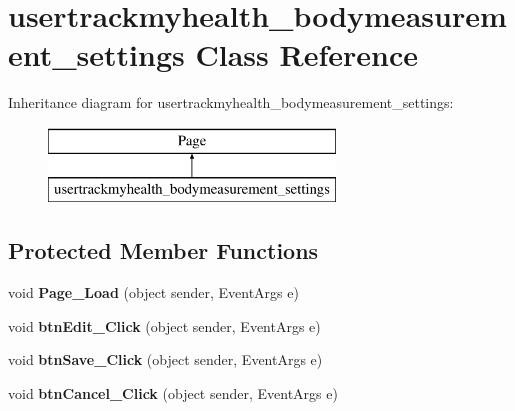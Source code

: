 \hypertarget{classusertrackmyhealth__bodymeasurement__settings}{\section{usertrackmyhealth\-\_\-bodymeasurement\-\_\-settings Class Reference}
\label{classusertrackmyhealth__bodymeasurement__settings}
}
Inheritance diagram for usertrackmyhealth\-\_\-bodymeasurement\-\_\-settings\-:\begin{figure}[H]
\begin{center}
\leavevmode
\includegraphics[height=2.000000cm]{classusertrackmyhealth__bodymeasurement__settings}
\end{center}
\end{figure}
\subsection*{Protected Member Functions}
\begin{DoxyCompactItemize}
\item 
\hypertarget{classusertrackmyhealth__bodymeasurement__settings_aaa54c5156b49fa58d9e7e03e2140f17f}{void {\bfseries Page\-\_\-\-Load} (object sender, Event\-Args e)}\label{classusertrackmyhealth__bodymeasurement__settings_aaa54c5156b49fa58d9e7e03e2140f17f}

\item 
\hypertarget{classusertrackmyhealth__bodymeasurement__settings_a49cf78ba0ea6ad63fdacab7d489a00f2}{void {\bfseries btn\-Edit\-\_\-\-Click} (object sender, Event\-Args e)}\label{classusertrackmyhealth__bodymeasurement__settings_a49cf78ba0ea6ad63fdacab7d489a00f2}

\item 
\hypertarget{classusertrackmyhealth__bodymeasurement__settings_a32c862dcfe157fd3b7885c4a8134f7dc}{void {\bfseries btn\-Save\-\_\-\-Click} (object sender, Event\-Args e)}\label{classusertrackmyhealth__bodymeasurement__settings_a32c862dcfe157fd3b7885c4a8134f7dc}

\item 
\hypertarget{classusertrackmyhealth__bodymeasurement__settings_a36d6403f5ef65b4355ec8fd0ea0b7bd1}{void {\bfseries btn\-Cancel\-\_\-\-Click} (object sender, Event\-Args e)}\label{classusertrackmyhealth__bodymeasurement__settings_a36d6403f5ef65b4355ec8fd0ea0b7bd1}

\end{DoxyCompactItemize}


